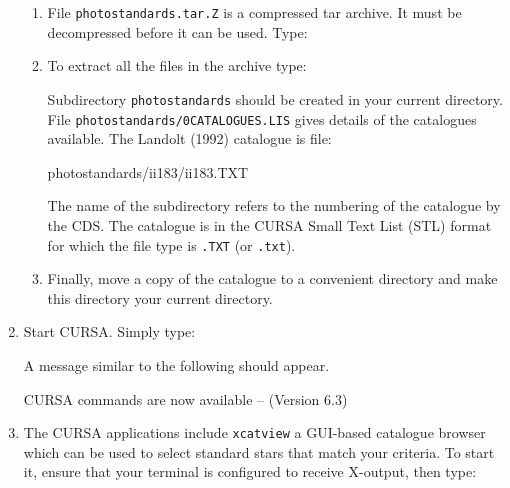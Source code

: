\documentclass[twoside,11pt,nolof]{starlink}
\begin{document}
\begin{enumerate}
\begin{enumerate}
    \item File \texttt{photostandards.tar.Z} is a compressed tar archive.
     It must be decompressed before it can be used.  Type:

\begin{terminalv}
\end{terminalv}

    \item To extract all the files in the archive type:

\begin{terminalv}
\end{terminalv}

     Subdirectory \texttt{photostandards} should be created in your current
     directory.  File \texttt{photostandards/0CATALOGUES.LIS} gives details
     of the catalogues available.  The Landolt (1992) catalogue is file:

\begin{terminalv}
photostandards/ii183/ii183.TXT
\end{terminalv}

     The name of the subdirectory refers to the numbering of the
     catalogue by the CDS.  The catalogue is in the CURSA Small Text List
     (STL) format for which the file type is \texttt{.TXT} (or \texttt{.txt}).

    \item Finally, move a copy of the catalogue to a convenient directory
     and make this directory your current directory.

  \end{enumerate}

  \item Start CURSA.  Simply type:

\begin{terminalv}
\end{terminalv}

   A message similar to the following should appear.

\begin{terminalv}

   CURSA commands are now available -- (Version 6.3)

\end{terminalv}

  \item The CURSA applications include \texttt{xcatview} a GUI-based
   catalogue browser which can be used to select standard stars that
   match your criteria.  To start it, ensure that your terminal is
   configured to receive X-output, then type:


\end{enumerate}
\end{document}
